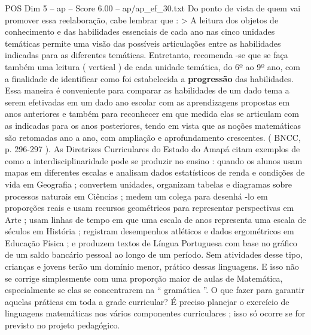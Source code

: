 \begin{textsample}{POS Dim 5 – ap – Score 6.00 – ap/ap\_ef\_30.txt}
Do ponto de vista de quem vai promover essa reelaboração, cabe lembrar que : > A leitura dos objetos de conhecimento e das habilidades essenciais de cada ano nas cinco unidades temáticas permite uma visão das possíveis articulações entre as habilidades indicadas para as diferentes temáticas.
Entretanto, recomenda -se que se faça também uma leitura ( vertical ) de cada unidade temática, do 6º ao 9º ano, com a finalidade de identificar como foi estabelecida a \textbf{progressão} das habilidades.
Essa maneira é conveniente para comparar as habilidades de um dado tema a serem efetivadas em um dado ano escolar com as aprendizagens propostas em anos anteriores e também para reconhecer em que medida elas se articulam com as indicadas para os anos posteriores, tendo em vista que as noções matemáticas são retomadas ano a ano, com ampliação e aprofundamento crescentes. ( BNCC, p. 296-297 ).
As Diretrizes Curriculares do Estado do Amapá citam exemplos de como a interdisciplinaridade pode se produzir no ensino : quando os alunos usam mapas em diferentes escalas e analisam dados estatísticos de renda e condições de vida em Geografia ; convertem unidades, organizam tabelas e diagramas sobre processos naturais em Ciências ; medem um colega para desenhá -lo em proporções reais e usam recursos geométricos para representar perspectivas em Arte ; usam linhas de tempo em que uma escala de anos representa uma escala de séculos em História ; registram desempenhos atléticos e dados ergométricos em Educação Física ; e produzem textos de Língua Portuguesa com base no gráfico de um saldo bancário pessoal ao longo de um período.
Sem atividades desse tipo, crianças e jovens terão um domínio menor, prático dessas linguagens.
E isso não se corrige simplesmente com uma proporção maior de aulas de Matemática, especialmente se elas se concentrarem na “ gramática ”.
O que fazer para garantir aquelas práticas em toda a grade curricular?
É preciso planejar o exercício de linguagens matemáticas nos vários componentes curriculares ; isso só ocorre se for previsto no projeto pedagógico.

\end{textsample}
